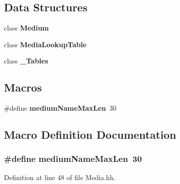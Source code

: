 \subsection*{Data Structures}
\begin{DoxyCompactItemize}
\item 
class {\bf Medium}
\item 
class {\bf Media\+Lookup\+Table}
\item 
class {\bf \+\_\+\+Tables}
\end{DoxyCompactItemize}
\subsection*{Macros}
\begin{DoxyCompactItemize}
\item 
\#define {\bf medium\+Name\+Max\+Len}~30
\end{DoxyCompactItemize}


\subsection{Macro Definition Documentation}
\subsubsection[{medium\+Name\+Max\+Len}]{\setlength{\rightskip}{0pt plus 5cm}\#define medium\+Name\+Max\+Len~30}\label{Media_8hh_a45dded5b9f118e98f2ee2e6840cecf20}


Definition at line 48 of file Media.\+hh.

